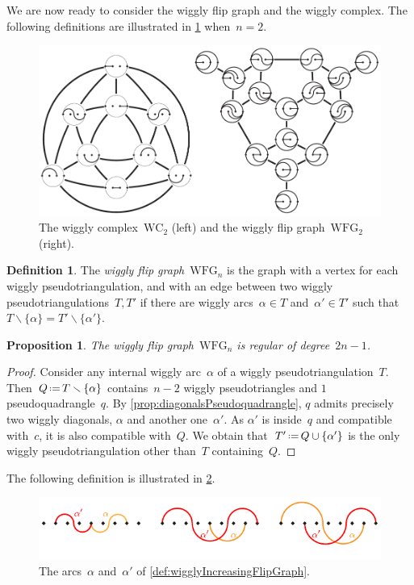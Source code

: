 \documentclass{amsart}
\newtheorem{proposition}[theorem]{Proposition}
\theoremstyle{definition}
\newtheorem{definition}[theorem]{Definition}
\newcommand{\ssm}{\smallsetminus} %
\newcommand{\eqdef}{\mbox{\,\raisebox{0.2ex}{\scriptsize\ensuremath{\mathrm:}}\ensuremath{=}\,}} %
\newcommand{\darkblue}{\color{darkblue}} %
\newcommand{\defn}[1]{\textsl{\darkblue #1}} %
\newcommand{\wigglyComplex}{\mathrm{WC}} %
\newcommand{\wigglyFlipGraph}{\mathrm{WFG}} %
\begin{document}
We are now ready to consider the wiggly flip graph and the wiggly complex.
The following definitions are illustrated in \cref{fig:wigglyComplex} when~$n = 2$.
%
\begin{figure}
\centerline{\includegraphics[scale=1.1]{wigglyComplex}}
\caption{The wiggly complex~$\wigglyComplex_2$ (left) and the wiggly flip graph~$\wigglyFlipGraph_2$ (right).}
\label{fig:wigglyComplex}
\end{figure}

\begin{definition}
The \defn{wiggly flip graph}~$\wigglyFlipGraph_n$ is the graph with a vertex for each wiggly pseudotriangulation, and with an edge between two wiggly pseudotriangulations~$T,T'$ if there are wiggly arcs~$\alpha \in T$ and~$\alpha' \in T'$ such that~$T \ssm \{\alpha\} = T' \ssm \{\alpha'\}$.
\end{definition}

\begin{proposition}
\label{prop:wigglyFlipGraph}
The wiggly flip graph~$\wigglyFlipGraph_n$ is regular of degree~$2n-1$.
\end{proposition}

\begin{proof}
Consider any internal wiggly arc~$\alpha$ of a wiggly pseudotriangulation~$T$.
Then~$Q \eqdef T \ssm \{\alpha\}$ contains~$n-2$ wiggly pseudotriangles and $1$ pseudoquadrangle~$q$.
By \cref{prop:diagonalsPseudoquadrangle}, $q$ admits precisely two wiggly diagonals, $\alpha$ and another one~$\alpha'$.
As $\alpha'$ is inside~$q$ and compatible with~$c$, it is also compatible with~$Q$.
We obtain that~$T' \eqdef Q \cup \{\alpha'\}$ is the only wiggly pseudotriangulation other than~$T$ containing~$Q$.
\end{proof}

The following definition is illustrated in \cref{fig:incompatible2}.
%
\begin{figure}
\centerline{\includegraphics[scale=1.3]{incompatible2}}
\caption{The arcs~$\alpha$ and~$\alpha'$ of \cref{def:wigglyIncreasingFlipGraph}.}
\label{fig:incompatible2}
\end{figure}
\end{document}
